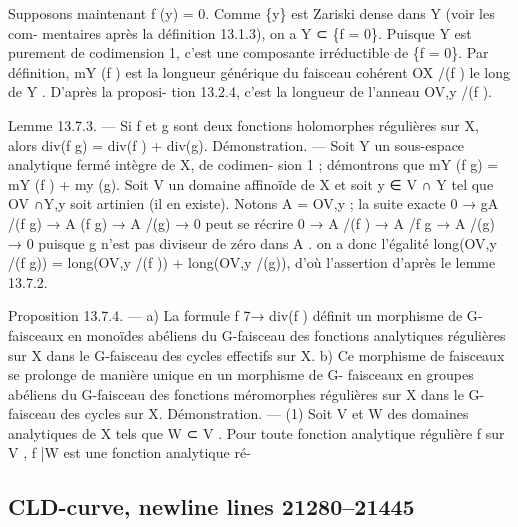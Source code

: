 \documentclass[
  10pt,
]{article}
\newenvironment{Shaded}{}{}
\newcommand{\NormalTok}[1]{#1}
\begin{document}
\begin{Shaded}
\begin{Highlighting}[]
\NormalTok{   Supposons maintenant f (y) = 0. Comme \{y\} est Zariski dense dans Y (voir les com{-}}
\NormalTok{mentaires après la définition 13.1.3), on a Y ⊂ \{f = 0\}. Puisque Y est purement de}
\NormalTok{codimension 1, c’est une composante irréductible de \{f = 0\}. Par définition, mY (f ) est}
\NormalTok{la longueur générique du faisceau cohérent OX /(f ) le long de Y . D’après la proposi{-}}
\NormalTok{tion 13.2.4, c’est la longueur de l’anneau OV,y /(f ).}

\NormalTok{Lemme 13.7.3. — Si f et g sont deux fonctions holomorphes régulières sur X,}
\NormalTok{alors div(f g) = div(f ) + div(g).}
\NormalTok{Démonstration. — Soit Y un sous{-}espace analytique fermé intègre de X, de codimen{-}}
\NormalTok{sion 1 ; démontrons que mY (f g) = mY (f ) + my (g). Soit V un domaine affinoïde de X}
\NormalTok{et soit y ∈ V ∩ Y tel que OV ∩Y,y soit artinien (il en existe). Notons A = OV,y ; la suite}
\NormalTok{exacte}
\NormalTok{                         0 → gA /(f g) → A (f g) → A /(g) → 0}
\NormalTok{peut se récrire}
\NormalTok{                           0 → A /(f ) → A /f g → A /(g) → 0}
\NormalTok{puisque g n’est pas diviseur de zéro dans A . on a donc l’égalité long(OV,y /(f g)) =}
\NormalTok{long(OV,y /(f )) + long(OV,y /(g)), d’où l’assertion d’après le lemme 13.7.2.}

\NormalTok{Proposition 13.7.4. — a) La formule f 7→ div(f ) définit un morphisme de G{-}}
\NormalTok{faisceaux en monoïdes abéliens du G{-}faisceau des fonctions analytiques régulières sur X}
\NormalTok{dans le G{-}faisceau des cycles effectifs sur X.}
\NormalTok{   b) Ce morphisme de faisceaux se prolonge de manière unique en un morphisme de G{-}}
\NormalTok{faisceaux en groupes abéliens du G{-}faisceau des fonctions méromorphes régulières sur X}
\NormalTok{dans le G{-}faisceau des cycles sur X.}
\NormalTok{Démonstration. — (1) Soit V et W des domaines analytiques de X tels que W ⊂ V .}
\NormalTok{Pour toute fonction analytique régulière f sur V , f |W est une fonction analytique ré{-}}
\end{Highlighting}
\end{Shaded}

\subsection{CLD-curve, newline lines
21280--21445}\label{cld-curve-newline-lines-2128021445}
\end{document}
